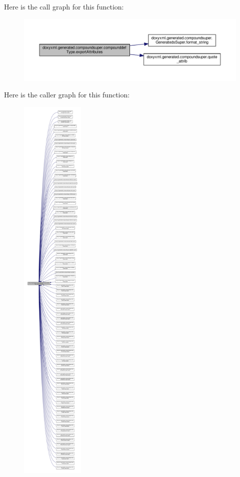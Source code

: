 Here is the call graph for this function\+:
\nopagebreak
\begin{figure}[H]
\begin{center}
\leavevmode
\includegraphics[width=350pt]{dc/d6a/classdoxyxml_1_1generated_1_1compoundsuper_1_1compounddefType_aa68129159b5590c9753cb8b88cf5147d_cgraph}
\end{center}
\end{figure}




Here is the caller graph for this function\+:
\nopagebreak
\begin{figure}[H]
\begin{center}
\leavevmode
\includegraphics[height=550pt]{dc/d6a/classdoxyxml_1_1generated_1_1compoundsuper_1_1compounddefType_aa68129159b5590c9753cb8b88cf5147d_icgraph}
\end{center}
\end{figure}


